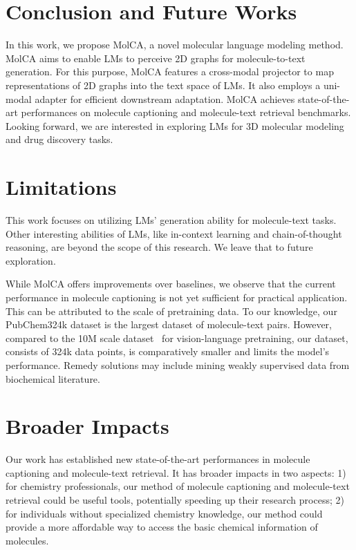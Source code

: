 \documentclass[11pt]{article}
\begin{document}
%
 \vspace{-3mm}
\section{Conclusion and Future Works}

\vspace{-3mm}
In this work, we propose MolCA, a novel molecular language modeling method. MolCA aims to enable LMs to perceive 2D graphs for molecule-to-text generation. For this purpose, MolCA features a cross-modal projector to map representations of 2D graphs into the text space of LMs. It also employs a uni-modal adapter for efficient downstream adaptation. MolCA achieves state-of-the-art performances on molecule captioning and molecule-text retrieval benchmarks. Looking forward, we are interested in exploring LMs for 3D molecular modeling and drug discovery tasks.



\section*{Limitations}
This work focuses on utilizing LMs' generation ability for molecule-text tasks. Other interesting abilities of LMs, like in-context learning and chain-of-thought reasoning, are beyond the scope of this research. We leave that to future exploration. 

While MolCA offers improvements over baselines, we observe that the current performance in molecule captioning is not yet sufficient for practical application. This can be attributed to the scale of pretraining data. To our knowledge, our PubChem324k dataset is the largest dataset of molecule-text pairs. However, compared to the 10M scale dataset~\citep{CC12M} for vision-language pretraining, our dataset, consists of 324k data points, is comparatively smaller and limits the model's performance. Remedy solutions may include mining weakly supervised data from biochemical literature.






\section*{Broader Impacts}
Our work has established new state-of-the-art performances in molecule captioning and molecule-text retrieval. It has broader impacts in two aspects: 1) for chemistry professionals, our method of molecule captioning and molecule-text retrieval could be useful tools, potentially speeding up their research process;
2) for individuals without specialized chemistry knowledge, our method could provide a more affordable way to access the basic chemical information of molecules. 
\end{document}
